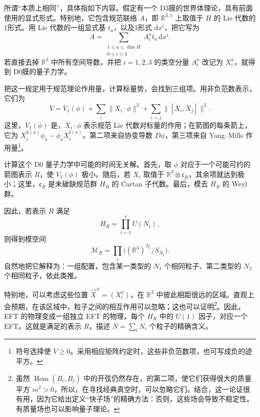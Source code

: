 所谓“本质上相同”，具体指如下内容。假定有一个 D3膜的世界体理论，具有前面使用的显式形式。特别地，它包含规范联络 $A$，即 $\mathbb{R}^{3,1}$ 上取值于 $H$ 的 Lie 代数的1形式。用 Lie 代数的一组显式基 $t_a$，以及1形式 $\mathrm{d}x^i$，把它写为
\[
A=\sum_{\substack{1\le a\le\dim H\\0\le i\le3}}A_i^at_a\,\mathrm{d}x^i.
\]
若直接去掉 $\mathbb{R}^3$ 中所有空间导数，并把 $i=1,2,3$ 的类空分量 $A_i^a$ 改记为 $X_i^a$，就得到 D0膜的量子力学。

把这一规定用于规范理论作用量，计算标量势，会找到三组项。用非负范数表示，它们为
\begin{equation}\label{eq:5.86}
V=V_1(\phi)+\sum_i\|X_i\cdot\phi\|^2
+\sum_{i<j}\|[X_i,X_j]\|^2.
\end{equation}
这里，$V_1(\phi)$ 是，$X_i\cdot\phi$ 表示规范 Lie 代数对标量的作用；在箭图的每条箭上，它为 $X_i^{h(a)}\phi_a-\phi_aX_i^{t(a)}$。第二项来自协变导数 $D\phi$，第三项来自 Yang--Mills 作用量\footnote{符号选择使 $V\ge0$。采用相应矩阵约定时，这些非负范数项，也可写成负的迹平方。}。

计算这个 D0 量子力学中可能的时间无关解。首先，取 $\phi$ 对应于一个可能可约的箭图表示 $R$，使 $V_1(\phi)$ 极小。随后，若 $X_i$ 取值于 $\mathbb{R}^3\otimes\mathfrak{c}_R$，其余项就达到极小；这里，$\mathfrak{c}_R$ 是未破缺规范群 $H_R$ 的 Cartan 子代数。最后，模去 $H_R$ 的 Weyl 群。

因此，若表示 $R$ 满足
\begin{equation}\label{eq:5.87}
H_R=\prod_{i=1}^rU(N_i),
\end{equation}
则得到模空间
\[
\mathcal{M}_R=\prod_i\bigl((\mathbb{R}^3)^{N_i}/S_{N_i}\bigr).
\]
自然地把它解释为：一组配置，包含某一类型的 $N_1$ 个相同粒子、第二类型的 $N_2$ 个相同粒子，依此类推。

特别地，可以考虑这些位置 $\vec X^{\,a}=(X_i^a)$，在 $\mathbb{R}^3$ 中彼此相距很远的区域。直观上会预期，在该区域中，粒子之间的相互作用可以忽略；这也可以证明\footnote{虽然 $\operatorname{Hom}(B_i,B_j)$ 中的开弦仍然存在，的第二项，使它们获得很大的质量平方 $m^2>0$，所以，在寻找经典真空时，可以忽略它们。结合，这一论证很有用，因为它给出定义“快子场”的精确方法：否则，这些场会导致不稳定性。有质量场也可以影响量子理论。}。因此，EFT 的物理变成一组独立 EFT 的物理，每个 $H_R$ 中的 $U(1)$ 因子，对应一个 EFT。这就是满足的表示 $R$，描述 $N=\sum_iN_i$ 个粒子的精确含义。

